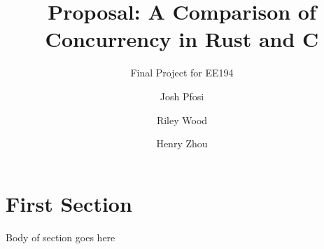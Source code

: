 \documentclass{scrartcl}
\title{Proposal: A Comparison of Concurrency in Rust and C}
\subtitle{Final Project for EE194}
\author{
    Josh Pfosi\\
    \and
    Riley Wood\\
    \and
    Henry Zhou\\
}
\begin{document}
\maketitle


\section*{First Section}
Body of section goes here




\end{document}

